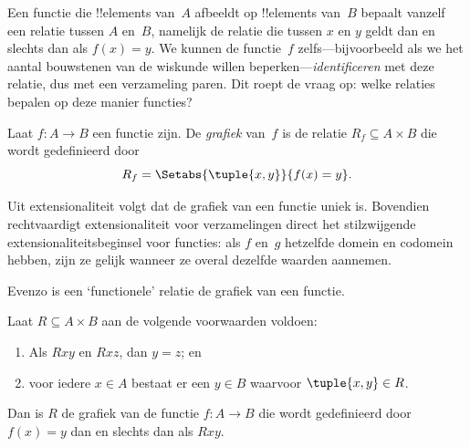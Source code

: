 \documentclass[openany]{memoir}
\begin{document}
\begingroup
\def\olfilename{OLP-0023}
\def\olfilepath{content/sets-functions-relations/functions/}
\hypertarget{unit-OLP-0023}{}






\begin{explain}
Een functie die !!{element}s van~$A$ afbeeldt op !!{element}s van~$B$
bepaalt vanzelf een relatie tussen $A$ en~$B$, namelijk de relatie die
tussen $x$ en $y$ geldt dan en slechts dan als $f(x) = y$. We kunnen
de functie~$f$ zelfs---bijvoorbeeld als we het aantal bouwstenen van
de wiskunde willen beperken---\emph{identificeren} met deze relatie,
dus met een verzameling paren. Dit roept de vraag op: welke relaties
bepalen op deze manier functies?
\end{explain}

\begin{defn} Laat $f\colon A \to B$ een
functie zijn. De \emph{grafiek} van~$f$ is de relatie $R_f \subseteq A
\times B$ die wordt gedefinieerd door
\[
R_f = \Setabs{\tuple{x,y}}{f(x) = y}.
\]
\end{defn}

\begin{explain}
Uit extensionaliteit volgt dat de grafiek van een functie uniek is.
Bovendien rechtvaardigt extensionaliteit voor verzamelingen direct het
stilzwijgende extensionaliteitsbeginsel voor functies: als $f$ en~$g$
hetzelfde domein en codomein hebben, zijn ze gelijk wanneer ze overal
dezelfde waarden aannemen.

Evenzo is een ‘functionele’ relatie de grafiek van een functie.
\end{explain}

\begin{prop}
Laat $R \subseteq A \times B$ aan de volgende voorwaarden voldoen:
\begin{enumerate}
\item Als $Rxy$ en $Rxz$, dan $y = z$; en
\item voor iedere $x \in A$ bestaat er een $y \in B$ waarvoor
$\tuple{x, y} \in R$.
\end{enumerate}
Dan is $R$ de grafiek van de functie $f\colon A \to B$ die wordt
gedefinieerd door $f(x) = y$ dan en slechts dan als $Rxy$.
\end{prop}
\end{document}
